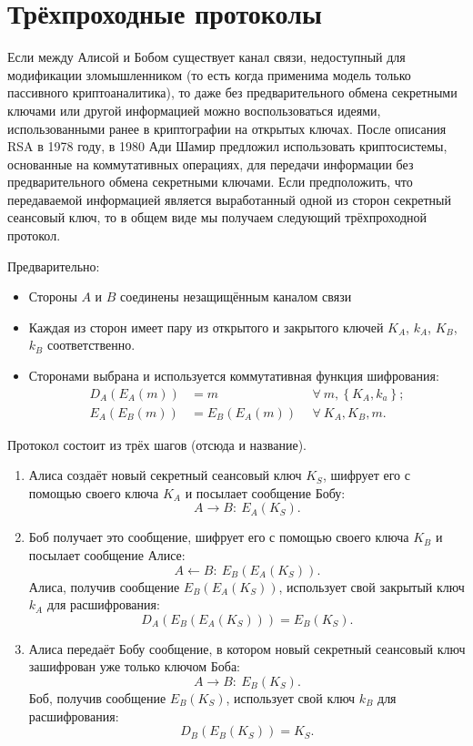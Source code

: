 \section{Трёхпроходные протоколы}

Если между Алисой и Бобом существует канал связи, недоступный для модификации зломышленником (то есть когда применима модель только пассивного криптоаналитика), то даже без предварительного обмена секретными ключами или другой информацией можно воспользоваться идеями, использованными ранее в криптографии на открытых ключах. После описания RSA в 1978 году, в 1980 Ади Шамир предложил использовать криптосистемы, основанные на коммутативных операциях, для передачи информации без предварительного обмена секретными ключами. Если предположить, что передаваемой информацией является выработанный одной из сторон секретный сеансовый ключ, то в общем виде мы получаем следующий трёхпроходной протокол.

Предварительно:

\begin{itemize}
	\item Стороны $A$ и $B$ соединены незащищённым каналом связи
	\item Каждая из сторон имеет пару из открытого и закрытого ключей $K_A$, $k_A$, $K_B$, $k_B$ соответственно.
	\item Сторонами выбрана и используется коммутативная функция шифрования:
	\begin{align*}
		D_{A} \left( E_{A} \left( m \right) \right)	&= m		& ~~\forall ~ m, \left\{ K_A, k_a \right\}; \\
		E_{A} \left( E_{B} \left( m \right) \right)	&= E_B \left( E_A \left( m \right) \right) & ~~\forall ~ K_A, K_B, m.
	\end{align*}
\end{itemize}

Протокол состоит из трёх шагов (отсюда и название).
\begin{enumerate}
    \item Алиса создаёт новый секретный сеансовый ключ $K_S$, шифрует его с помощью своего ключа $K_A$ и посылает сообщение Бобу:
        \[ A \rightarrow B: ~ E_A \left( K_S \right). \]
    \item Боб получает это сообщение, шифрует его с помощью своего ключа $K_B$ и посылает сообщение Алисе:
        \[ A \leftarrow B: ~ E_B \left( E_A \left( K_S \right) \right). \]
    Алиса, получив сообщение $E_B \left( E_A \left( K_S \right) \right)$, использует свой закрытый ключ $k_A$ для расшифрования:
            \[ D_A \left( E_B \left( E_A \left( K_S \right) \right) \right) = E_B \left( K_S \right). \]
    \item Алиса передаёт Бобу сообщение, в котором новый секретный сеансовый ключ зашифрован уже только ключом Боба:
        \[ A \rightarrow B: ~ E_B \left( K_S \right). \]
    Боб, получив сообщение $E_B \left( K_S \right)$, использует свой ключ $k_B$ для расшифрования:
            \[ D_B \left( E_B \left( K_S \right) \right) = K_S. \]
\end{enumerate}

